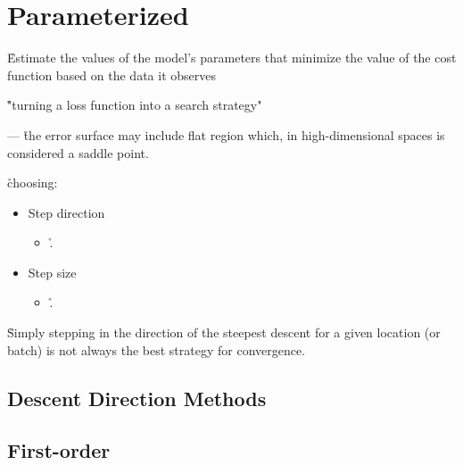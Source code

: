 \section{Parameterized}
\label{subsec:optimization}


\r{Estimate the values of the model's parameters that minimize the value of the cost function based on the data it observes}

\r{"turning a loss function into a search strategy"}


 --- \r{the error surface may include flat region which, in high-dimensional spaces is considered a saddle point.}


\r{choosing:}

\begin{itemize}[noitemsep,topsep=0pt]
	\item Step direction
	\begin{itemize}[noitemsep,topsep=0pt]
		\item \r{.}
	\end{itemize}
	\item Step size
	\begin{itemize}[noitemsep,topsep=0pt]
		\item \r{.}
	\end{itemize}
\end{itemize}

\r{Simply stepping in the direction of the steepest descent for a given location (or batch) is not always the best strategy for convergence. }



\subsection{Descent Direction Methods}




\subsection{First-order}

